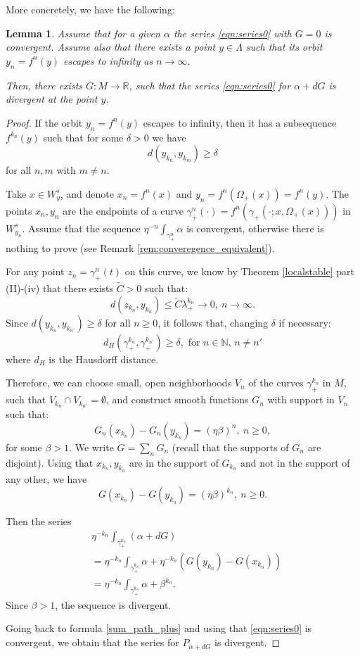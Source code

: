 \documentclass[11pt]{amsart}
\newtheorem{lem}[thm]{Lemma}
\theoremstyle{definition}
\theoremstyle{remark}
\numberwithin{equation}{section}
\newcommand{\R}{\mathbb R}
\newcommand{\N}{\mathbb N}
\begin{document}
More concretely, we have the following:
\begin{lem}
Assume that for a given $\alpha$ the series \eqref{eqn:series0} with $G=0$ is convergent.
Assume also  that there exists a point
$y\in \Lambda$ such that its orbit $y_n=f^n(y)$ escapes to infinity as $n\to \infty$.

Then, there exists $G:M\to \R$, such that the series \eqref{eqn:series0} for $\alpha +dG$
is divergent at the point $y$.
\end{lem}
\begin{proof}

If the  orbit $y_n=f^n(y)$ escapes to infinity, then it has a subsequence $f^{k_n}(y)$ such that for some $\delta>0$ we have
\[
d(y_{k_n},y_{k_{m}})\ge \delta
\]
for all $n,m$ with $m \ne n$.

Take $x\in W^s_y$,
and denote  $x_n =f^n(x)$ and $y_n =f^n(\Omega_+(x))=f^n(y)$.
The points $x_n,y_n$ are the endpoints of a curve $\gamma^n_+(\cdot)=f^n(\gamma_+(\cdot;x, \Omega_+(x)))$ in $W^s_{y_n}$.
Assume that the sequence
$\eta^{-n} \int_{\gamma^n_+}\alpha$ is convergent, otherwise there is nothing to prove (see Remark \ref{rem:converegence_equivalent}).



For any point $z_n=\gamma^n_+(t)$ on this curve,
 we know by  Theorem \ref{localstable} part (II)-(iv) that there exists $\tilde C >0$ such that:
\[
d(z_{k_n},y_{k_n})
\le \tilde C   \lambda_+ ^{k_n} \to 0, \ n\to \infty .
\]
Since $d(y_{k_n},y_{k_{n'}})\ge \delta$ for all $n \ge 0$,  it follows  that, changing $\delta$ if necessary:
\[
d_H(\gamma^{k_n}_+,\gamma^{k_{n'}}_+)\ge \delta , \textrm{ for } n \in \N,\, n \ne n'
\]
where $d_H$ is the Hausdorff distance.

Therefore, we can choose small, open neighborhoods
$V_n$  of the curves $\gamma^{k_n}_+$ in $M$, such that $V_{k_n}\cap V_{k_{n'}}=\emptyset$, and  construct    smooth functions $G_n$ with support in $V_n$ such that:
\[
G_n(x_{k_n})- G_n(y_{k_n})=(\eta\beta)^n, \ n\ge 0,
\]
for some $\beta>1$.
We  write $G = \sum_n G_n$ (recall that the supports of $G_n$ are disjoint).
Using that $x_{k_n}, y_{k_n}$ are in the support of $G_{k_n}$ and not
in the support of any other, we have
\[
G (x_{k_n})- G (y_{k_n})= (\eta\beta)^{k_n} , \ n\ge 0.
\]

Then the series
\begin{equation}
\begin{split}
&\eta^{-k_n} \int_{\gamma^{k_n}_+}\left(\alpha+dG\right)\\
&=\eta^{-k_n}\int_{\gamma^{k_n}_+}\alpha+\eta^{-k_n} (G(y_{k_n})-G(x_{k_n}))\\
&=\eta^{-k_n}  \int_{\gamma^{k_n}_+}\alpha+\beta^{k_n}.
\end{split}
\end{equation}
Since $\beta>1$, the sequence  is divergent.

Going back to formula \eqref{sum_path_plus} and using that   \eqref{eqn:series0}  is convergent, we obtain that the series for $P_{\alpha +dG}$ is divergent.
\end{proof}
\end{document}

